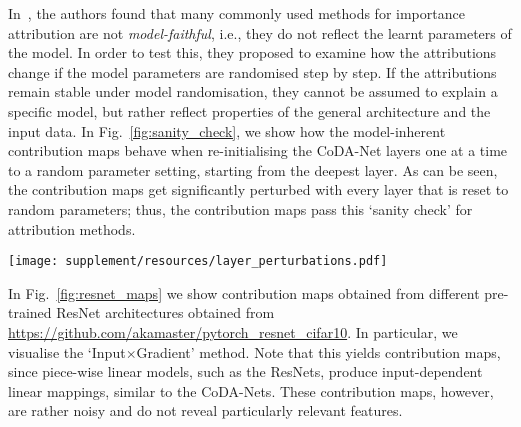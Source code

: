 In~, the authors found that many commonly used methods for importance attribution are not \emph{model-faithful}, i.e., they do not reflect the learnt parameters of the model. In order to test this, they proposed to examine how the attributions change if the model parameters are randomised step by step. If the attributions remain stable under model randomisation, they cannot be assumed to explain a specific model, but rather reflect properties of the general architecture and the input data. In Fig.~\ref{fig:sanity_check}, we show how the model-inherent contribution maps behave when re-initialising the CoDA-Net layers one at a time to a random parameter setting, starting from the deepest layer. As can be seen, the contribution maps get significantly perturbed with every layer that is reset to random parameters; thus, the contribution maps pass this `sanity check' for attribution methods.
\clearpage
\begin{figure*}[t]
    \centering
    \centering
    \texttt{[image: supplement/resources/layer\_perturbations.pdf]}
    \caption{Sanity check experiment as in~\protect{}. If the importance attributions remain stable under parameter randomisation, they cannot be assumed to faithfully reflect the learnt parameters of the model. Since  the contribution maps get significantly perturbed when re-initialising layers
            from network output (left) to network input (right), the model-inherent contribution maps thus pass this sanity check.
            Positive contributions are shown in red, negative contributions in blue.
    }
    \label{fig:sanity_check}
\end{figure*}


In Fig.~\ref{fig:resnet_maps} we show contribution maps obtained from different pre-trained ResNet architectures obtained from
    \url{https://github.com/akamaster/pytorch_resnet_cifar10}.
In particular, we visualise the `Input$\times$Gradient' method. Note that this yields contribution maps, since piece-wise linear models, such as the ResNets, produce input-dependent linear mappings, similar to the CoDA-Nets. These contribution maps, however, are rather noisy and do not reveal particularly relevant features.

